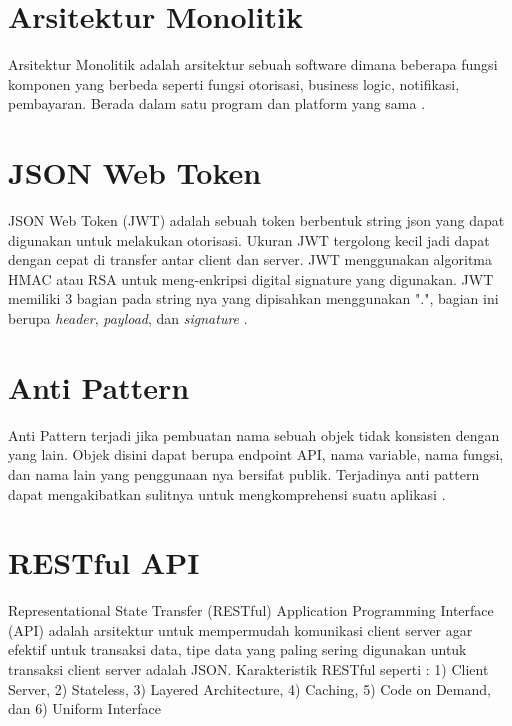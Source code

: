 \section{Arsitektur Monolitik}
Arsitektur Monolitik adalah arsitektur sebuah software dimana beberapa fungsi komponen yang berbeda seperti fungsi otorisasi, business logic, notifikasi, pembayaran. Berada dalam satu program dan platform yang sama \cite{gos2020comparison}. 


\section{JSON Web Token}
JSON Web Token (JWT) adalah sebuah token berbentuk string json yang dapat digunakan untuk melakukan otorisasi. Ukuran JWT tergolong kecil jadi dapat dengan cepat di transfer antar client dan server. JWT menggunakan algoritma HMAC atau RSA untuk meng-enkripsi digital signature yang digunakan. JWT memiliki 3 bagian pada string nya yang dipisahkan menggunakan ".", bagian ini berupa \textit{header}, \textit{payload}, dan \textit{signature} \cite{rahmatullo2019stateless}.

\section{Anti Pattern}
Anti Pattern terjadi jika pembuatan nama sebuah objek tidak konsisten dengan yang lain. Objek disini dapat berupa endpoint API, nama variable, nama fungsi, dan nama lain yang penggunaan nya bersifat publik. Terjadinya anti pattern dapat mengakibatkan sulitnya untuk mengkomprehensi suatu aplikasi \cite{Aghajani2018} \cite{Alshraiedeh2021}.

\section{RESTful API}
Representational State Transfer (RESTful) Application Programming Interface (API) adalah arsitektur untuk mempermudah komunikasi client server agar efektif untuk transaksi data, tipe data yang paling sering digunakan untuk transaksi client server adalah JSON. Karakteristik RESTful seperti : 1) Client Server, 2) Stateless, 3) Layered Architecture, 4) Caching, 5) Code on Demand, dan 6) Uniform Interface \cite{giessler2015best}

